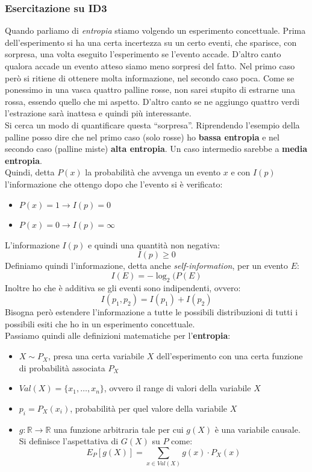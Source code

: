 \documentclass[a4paper,12pt, oneside]{book}
\begin{document}
\subsubsection{Esercitazione su ID3}
Quando parliamo di \textit{entropia} stiamo volgendo un esperimento
concettuale. Prima dell'esperimento si ha una certa incertezza su un certo
eventi, che sparisce, con sorpresa, una volta eseguito l'esperimento se l'evento
accade. D'altro canto qualora accade un evento atteso siamo meno sorpresi del
fatto. Nel primo caso però si ritiene di ottenere molta informazione, nel
secondo caso poca. Come se ponessimo in una vasca quattro palline rosse, non
sarei stupito di estrarne una rossa, essendo quello che mi aspetto. D'altro
canto se ne aggiungo quattro verdi l'estrazione sarà inattesa e quindi più
interessante.\\ 
Si cerca un modo di quantificare questa ``sorpresa''. Riprendendo l'esempio
della palline posso dire che nel primo caso (solo rosse) ho \textbf{bassa
  entropia} e nel secondo caso (palline miste) \textbf{alta entropia}. Un caso
intermedio sarebbe a \textbf{media entropia}.\\
Quindi, detta $P(x)$ la probabilità che avvenga un evento $x$ e con $I(p)$
l'informazione che ottengo dopo che l'evento si è verificato:
\begin{itemize}
  \item $P(x)=1\to I(p)=0$
  \item $P(x)=0\to I(p)=\infty$
\end{itemize}
L'informazione $I(p)$ e quindi una quantità non negativa:
\[I(p)\geq 0\]
Definiamo quindi l'informazione, detta anche \textit{self-information}, per un
evento $E$: 
\[I(E)=-\log_2(P(E)\]
Inoltre ho che è additiva se gli eventi sono indipendenti, ovvero:
\[I(p_1,p_2)=I(p_1)+I(p_2)\]
Bisogna però estendere l'informazione a tutte le possibili distribuzioni di
tutti i possibili esiti che ho in un esperimento concettuale.\\
Passiamo quindi alle definizioni matematiche per l'\textbf{entropia}:
\begin{itemize}
  \item $X\sim P_X$, presa una certa variabile $X$ dell'esperimento con una
  certa funzione di probabilità associata $P_X$
  \item $Val(X)=\{x_1,\ldots,x_n\}$, ovvero il range di valori della variabile
  $X$
  \item $p_i=P_X(x_i)$, probabilità per quel valore della variabile $X$
  \item $g:\mathbb{R}\to\mathbb{R}$ una funzione arbitraria tale per cui $g(X)$
  è una variabile causale. Si definisce l'aspettativa di $G(X)$ su $P$ come:
  \[E_P[g(X)]=\sum_{x\in Val(X)} g(x)\cdot P_X(x)\]
\end{itemize}
\end{document}
